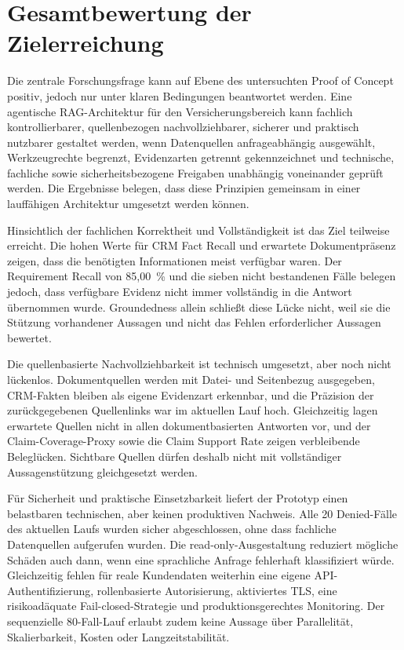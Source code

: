 \section{Gesamtbewertung der Zielerreichung}

Die zentrale Forschungsfrage kann auf Ebene des untersuchten Proof of Concept positiv, jedoch nur unter klaren Bedingungen beantwortet werden. Eine agentische RAG-Architektur für den Versicherungsbereich kann fachlich kontrollierbarer, quellenbezogen nachvollziehbarer, sicherer und praktisch nutzbarer gestaltet werden, wenn Datenquellen anfrageabhängig ausgewählt, Werkzeugrechte begrenzt, Evidenzarten getrennt gekennzeichnet und technische, fachliche sowie sicherheitsbezogene Freigaben unabhängig voneinander geprüft werden. Die Ergebnisse belegen, dass diese Prinzipien gemeinsam in einer lauffähigen Architektur umgesetzt werden können.

Hinsichtlich der fachlichen Korrektheit und Vollständigkeit ist das Ziel teilweise erreicht. Die hohen Werte für CRM Fact Recall und erwartete Dokumentpräsenz zeigen, dass die benötigten Informationen meist verfügbar waren. Der Requirement Recall von 85{,}00~\% und die sieben nicht bestandenen Fälle belegen jedoch, dass verfügbare Evidenz nicht immer vollständig in die Antwort übernommen wurde. Groundedness allein schließt diese Lücke nicht, weil sie die Stützung vorhandener Aussagen und nicht das Fehlen erforderlicher Aussagen bewertet.

Die quellenbasierte Nachvollziehbarkeit ist technisch umgesetzt, aber noch nicht lückenlos. Dokumentquellen werden mit Datei- und Seitenbezug ausgegeben, CRM-Fakten bleiben als eigene Evidenzart erkennbar, und die Präzision der zurückgegebenen Quellenlinks war im aktuellen Lauf hoch. Gleichzeitig lagen erwartete Quellen nicht in allen dokumentbasierten Antworten vor, und der Claim-Coverage-Proxy sowie die Claim Support Rate zeigen verbleibende Beleglücken. Sichtbare Quellen dürfen deshalb nicht mit vollständiger Aussagenstützung gleichgesetzt werden.

Für Sicherheit und praktische Einsetzbarkeit liefert der Prototyp einen belastbaren technischen, aber keinen produktiven Nachweis. Alle 20 Denied-Fälle des aktuellen Laufs wurden sicher abgeschlossen, ohne dass fachliche Datenquellen aufgerufen wurden. Die read-only-Ausgestaltung reduziert mögliche Schäden auch dann, wenn eine sprachliche Anfrage fehlerhaft klassifiziert würde. Gleichzeitig fehlen für reale Kundendaten weiterhin eine eigene API-Authentifizierung, rollenbasierte Autorisierung, aktiviertes TLS, eine risikoadäquate Fail-closed-Strategie und produktionsgerechtes Monitoring. Der sequenzielle 80-Fall-Lauf erlaubt zudem keine Aussage über Parallelität, Skalierbarkeit, Kosten oder Langzeitstabilität.

